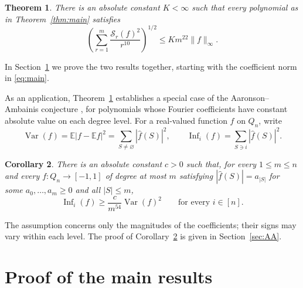 \documentclass[11pt]{amsart}
\newtheorem{theorem}{Theorem}[section]
\newtheorem{corollary}[theorem]{Corollary}
\theoremstyle{remark}
\numberwithin{equation}{section}
\newcommand{\E}{\mathbb E}
\begin{document}
\begin{theorem}\label{thm:weighted}
There is an absolute constant $K<\infty$ such that every polynomial as in
Theorem~\ref{thm:main} satisfies
\begin{equation}\label{eq:weighted-intro}
\left(\sum_{r=1}^m\frac{\mathcal{S}_{r}(f)^2}{r^{10}}\right)^{1/2}
\le Km^{22}\|f\|_\infty.
\end{equation}
\end{theorem}

In Section~\ref{sec:proof} we prove the two results together, starting
with the coefficient norm in \eqref{eq:main}.

As an application, Theorem~\ref{thm:weighted} establishes a special case of
the Aaronson--Ambainis conjecture \cite{AA14}, for polynomials whose Fourier
coefficients have constant absolute value on each degree level. For a
real-valued function $f$ on $Q_n$, write
\[
\operatorname{Var}(f)=\E|f-\E f|^2
=\sum_{S\ne\varnothing}|\widehat f(S)|^2,
\qquad
\operatorname{Inf}_i(f)=\sum_{S\ni i}|\widehat f(S)|^2.
\]

\begin{corollary}\label{cor:AA}
There is an absolute constant $c>0$ such that, for every $1\le m\le n$
and every $f:Q_n\to[-1,1]$ of degree at most $m$ satisfying
$|\widehat f(S)|=a_{|S|}$ for some $a_0,\ldots,a_m\ge0$ and all $|S|\le m$,
\[
\operatorname{Inf}_i(f)\ge
\frac{c}{m^{54}}\operatorname{Var}(f)^2
\qquad\text{for every }i\in[n].
\]
\end{corollary}

The assumption concerns only the magnitudes of the coefficients; their
signs may vary within each level. The proof of Corollary~\ref{cor:AA}
is given in Section~\ref{sec:AA}.

\section{Proof of the main results}\label{sec:proof}
\end{document}

